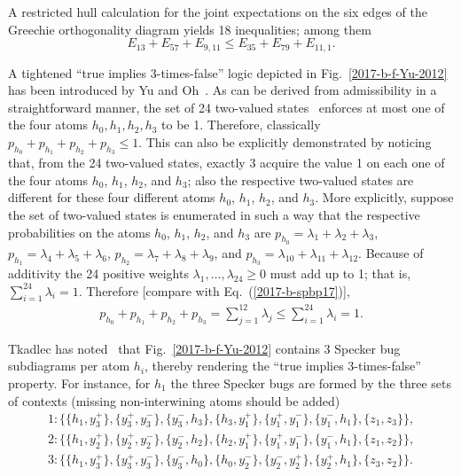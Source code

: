 A restricted hull calculation for the joint expectations on the six edges of the Greechie orthogonality diagram yields 18 inequalities; among them
\begin{equation}
E_{13}  + E_{57} + E_{9,11} \le   E_{35} + E_{79} +   E_{11,1}
.
\label{2017-b-sp-hcrc}
\end{equation}



A tightened ``true implies 3-times-false'' logic depicted in Fig.~\ref{2017-b-f-Yu-2012} has been introduced by Yu and Oh~\cite{Yu-2012}.
As can be derived from admissibility in a straightforward manner,
the set of 24 two-valued states~\cite{tkadlec-priv-2017} enforces at most one of the four atoms $h_0,h_1,h_2,h_3$ to be 1.
Therefore, classically $p_{h_0} + p_{h_1} + p_{h_2} + p_{h_3} \le 1$.
This can also be explicitly demonstrated by  noticing that, from the 24 two-valued states,
exactly 3 acquire the value 1 on each one of  the four atoms
$h_0$,
$h_1$,
$h_2$, and
$h_3$; also the respective two-valued states are different for these four different atoms $h_0$,
$h_1$,
$h_2$, and
$h_3$.
More explicitly, suppose the set of two-valued states is enumerated in such a way that the respective probabilities
on the atoms $h_0$,
$h_1$,
$h_2$, and
$h_3$
are
$p_{h_0}=\lambda_1+\lambda_2+\lambda_3$,
$p_{h_1}=\lambda_4+\lambda_5+\lambda_6$,
$p_{h_2}=\lambda_7+\lambda_8+\lambda_9$, and
$p_{h_3}=\lambda_{10}+\lambda_{11}+\lambda_{12}$.
Because of additivity the 24 positive weights $\lambda_{1},\ldots ,\lambda_{24} \ge 0$
must add up to 1; that is, $\sum_{i=1}^{24} \lambda_{i}=1$.
Therefore [compare with Eq.~(\ref{2017-b-spbp17})],
\begin{equation}
\begin{split}
p_{h_0} + p_{h_1} + p_{h_2} + p_{h_3}
= \sum_{j=1}^{12} \lambda_{j} \le \sum_{i=1}^{24} \lambda_{i}=1
.
\end{split}
\label{2017-b-yo-ohprobs}
\end{equation}

Tkadlec has noted~\cite{tkadlec-priv-2017} that Fig.~\ref{2017-b-f-Yu-2012}
contains 3 Specker bug subdiagrams per atom $h_i$, thereby rendering the ``true implies 3-times-false'' property.
For instance, for $h_1$ the three Specker bugs are formed by the three sets of contexts (missing non-interwining atoms should be added)
\begin{equation}
\begin{split}
1: \{\{h_1, y_3^+ \},\{ y_3^+, y_3^- \},\{ y_3^- , h_3 \},\{ h_3 , y_1^+ \},
\{ y_1^+, y_1^- \},\{ y_1^- , h_1 \},\{ z_1 , z_3 \}\},  \\
2: \{\{h_1 , y_2^+ \},\{ y_2^+ , y_2^- \},\{ y_2^-, h_2 \},\{ h_2,y_1^+ \},
\{ y_1^+ , y_1^- \},\{ y_1^- , h_1 \},\{ z_1 , z_2  \}\}, \\
3: \{\{h_1 , y_3^+ \},\{ y_3^+ , y_3^- \},\{ y_3^-, h_0 \},\{ h_0 ,y_2^- \},
\{ y_2^-, y_2^+ \},\{ y_2^+, h_1 \},\{ z_3 , z_2   \}\}.
\end{split}
\label{2017-b-yo-sb}
\end{equation}


